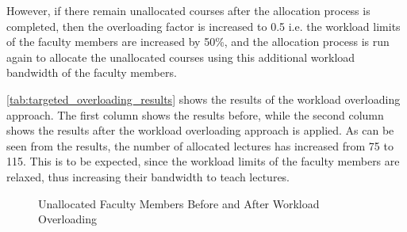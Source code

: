 However, if there remain unallocated courses after the allocation process is completed, then the overloading factor is increased to 0.5 i.e. the workload limits of the faculty members are increased by 50\%, and the allocation process is run again to allocate the unallocated courses using this additional workload bandwidth of the faculty members.

\begin{table}[H]
  \centering
  \caption{Allocation Results Before and After Workload Overloading}
  \label{tab:targeted_overloading_results}
\end{table}

\autoref{tab:targeted_overloading_results} shows the results of the workload overloading approach. The first column shows the results before, while the second column shows the results after the workload overloading approach is applied. As can be seen from the results, the number of allocated lectures has increased from 75 to 115. This is to be expected, since the workload limits of the faculty members are relaxed, thus increasing their bandwidth to teach lectures.


\begin{figure}[H]
  \centering

  \caption{Unallocated Faculty Members Before and After Workload Overloading}
  \label{fig:faculty_utilization_workload_overloading}
\end{figure}


